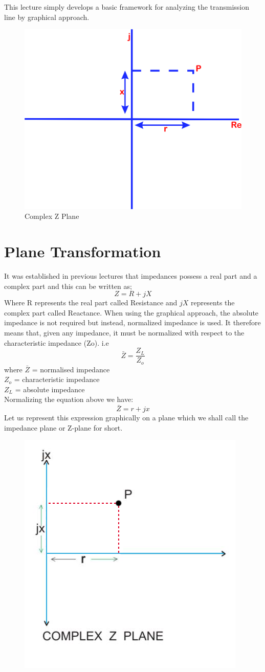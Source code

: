 This lecture simply develops a basic framework for analyzing the transmission line by graphical approach.
\begin{figure}[h]
\centering
\includegraphics[width=0.5\linewidth]{./graphics/mjhdj}
\caption{Complex Z Plane}
\label{fig:mjhdj}
\end{figure}

\section{Plane Transformation}
It was established in previous lectures that impedances possess a real part and a complex part and this can be written as;
\begin{equation*}
Z= R+jX
\end{equation*}
Where R  represents the real part called Resistance and $jX$ represents the complex part called Reactance. When using the graphical approach, the absolute impedance is not required but instead, normalized impedance is used. It therefore means that, given any impedance, it must be normalized with respect to the characteristic impedance (Zo). i.e
\begin{equation*}
\bar{Z}=\frac{Z_L}{Z_o}
\end{equation*}
where $\bar{Z}$ = normalised impedance\\
$Z_o$ = characteristic impedance\\
$Z_L$   =  absolute  impedance \\
Normalizing the equation above we have: 
\begin{equation*}
\bar{Z}= r + jx
\end{equation*}
Let us represent this expression graphically on a plane which we shall call the impedance plane or Z-plane for short.
\begin{figure}[h]
\center\includegraphics[width=0.5\linewidth]{./graphics/TransLine2 RETOUCHED}
\label{fig:transline2}
\end{figure}

